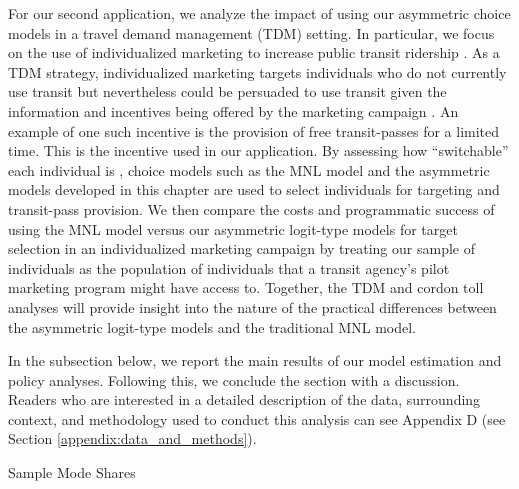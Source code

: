 For our second application, we analyze the impact of using our asymmetric choice models in a travel demand management (TDM) setting. In particular, we focus on the use of individualized marketing to increase public transit ridership \citep{brog_individualized1998}. As a TDM strategy, individualized marketing targets individuals who do not currently use transit but nevertheless could be persuaded to use transit given the information and incentives being offered by the marketing campaign \citep{brog_individualized1998}. An example of one such incentive is the provision of free transit-passes for a limited time. This is the incentive used in our application. By assessing how ``switchable'' each individual is \citep{gensch_targeting_1984}, choice models such as the MNL model and the asymmetric models developed in this chapter are used to select individuals for targeting and transit-pass provision. We then compare the costs and programmatic success of using the MNL model versus our asymmetric logit-type models for target selection in an individualized marketing campaign by treating our sample of individuals as the population of individuals that a transit agency's pilot marketing program might have access to. Together, the TDM and cordon toll analyses will provide insight into the nature of the practical differences between the asymmetric logit-type models and the traditional MNL model.

In the subsection below, we report the main results of our model estimation and policy analyses. Following this, we conclude the section with a discussion. Readers who are interested in a detailed description of the data, surrounding context, and methodology used to conduct this analysis can see Appendix D (see Section \ref{appendix:data_and_methods}).

\begin{table}
\centering

\caption{Sample Mode Shares}
\label{table:sample_mode_shares}



\end{table}

